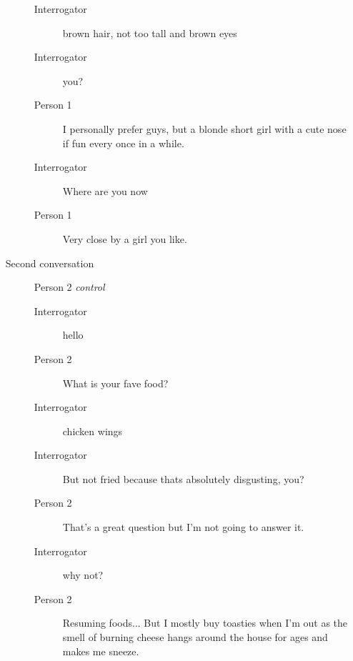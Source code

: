 \begin{itemize}
\begin{description}
\begin{description}
               \item [Interrogator] brown hair, not too tall and brown eyes
               \item [Interrogator] you?
               \item [Person 1] I personally prefer guys, but a blonde short girl with a cute nose if fun every once in a while.
               \item [Interrogator] Where are you now
               \item [Person 1] Very close by a girl you like.
            \end{description}
         \item [Second conversation] Person 2 \textit{control}
            \begin{description}
               \item [Interrogator] hello
               \item [Person 2] What is your fave food?
               \item [Interrogator] chicken wings
               \item [Interrogator] But not fried because thats absolutely disgusting, you?
               \item [Person 2] That's a great question but I'm not going to answer it.
               \item [Interrogator] why not?
               \item [Person 2] Resuming foods... But I mostly buy toasties when I'm out as the smell of burning cheese hangs around the house for ages and makes me sneeze.
            \end{description}
      \end{description}

\end{itemize}
